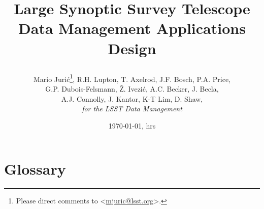 \documentclass[12pt]{article}
\title{Large Synoptic Survey Telescope \\
Data Management Applications Design \\
{\author{
    Mario Juri\'c\footnote{Please direct comments to \textless\href{mailto:mjuric@lsst.org}{mjuric@lsst.org}\textgreater.},
    R.H. Lupton, T. Axelrod, J.F. Bosch, P.A. Price, \\
    G.P. Dubois-Felsmann, \v{Z}. Ivezi\'c, A.C. Becker, J. Becla,  \\ 
     A.J. Connolly, J. Kantor, K-T Lim, D. Shaw, \\
    {\em for the LSST Data Management}
}}}
\begin{document}
\date{\today, \currenttime hrs}
\maketitle
\pagestyle{headings}



\tableofcontents















\section{Glossary}
\end{document}
